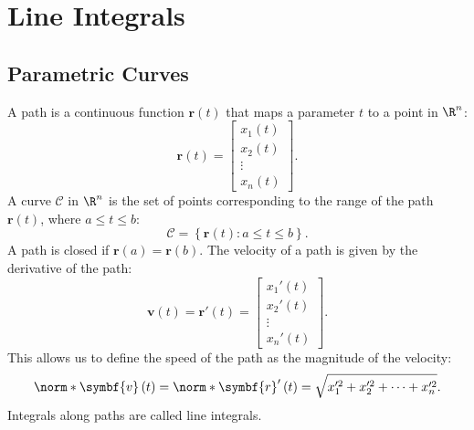 \documentclass{article}
\begin{document}
\section{Line Integrals}
\subsection{Parametric Curves}
A path is a continuous function \(\symbf{r}\left( t \right)\) that maps
a parameter \(t\) to a point in \(\R^n\):
\begin{equation*}
    \symbf{r}\left( t \right) =
    \begin{bmatrix}
        x_1\left( t \right) \\
        x_2\left( t \right) \\
        \vdots              \\
        x_n\left( t \right)
    \end{bmatrix}
    .
\end{equation*}
A curve \(\mathscr{C}\) in \(\R^n\) is the set of points corresponding
to the range of the path \(\symbf{r}\left( t \right)\), where
\(a \leqslant t \leqslant b\):
\begin{equation*}
    \mathscr{C} = \left\{ \symbf{r}\left( t \right) : a \leqslant t \leqslant b \right\}.
\end{equation*}
A path is closed if \(\symbf{r}\left( a \right) = \symbf{r}\left( b \right)\).
The velocity of a path is given by the derivative of the path:
\begin{equation*}
    \symbf{v}\left( t \right) = \symbf{r}'\left( t \right) =
    \begin{bmatrix}
        x_1'\left( t \right) \\
        x_2'\left( t \right) \\
        \vdots               \\
        x_n'\left( t \right)
    \end{bmatrix}
    .
\end{equation*}
This allows us to define the speed of the path as the magnitude of the
velocity:
\begin{equation*}
    \norm*{\symbf{v}\left( t \right)} = \norm*{\symbf{r}'\left( t \right)} = \sqrt{x_1'^2 + x_2'^2 + \cdots + x_n'^2}.
\end{equation*}
Integrals along paths are called line integrals.
\end{document}
